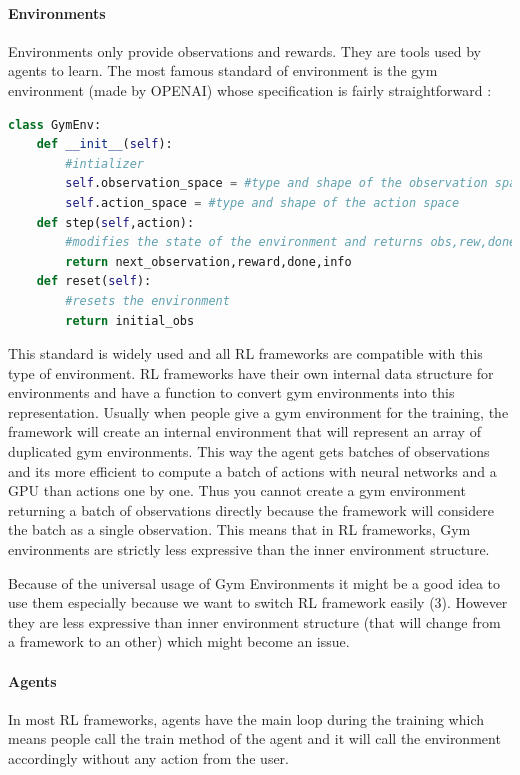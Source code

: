 \documentclass[11pt]{article}
\begin{document}
\paragraph{Environments}
Environments only provide observations and rewards. They are tools used by agents to learn. 
The most famous standard of environment is the gym environment (made by OPENAI) whose specification is fairly straightforward :
\begin{lstlisting}[language=Python]
class GymEnv:
	def __init__(self):
		#intializer
		self.observation_space = #type and shape of the observation space
		self.action_space = #type and shape of the action space
	def step(self,action):
		#modifies the state of the environment and returns obs,rew,done=(if the env needs to be reset),info=debug
		return next_observation,reward,done,info
	def reset(self):
		#resets the environment
		return initial_obs
\end{lstlisting}
This standard is widely used and all RL frameworks are compatible with this type of environment. RL frameworks have their own internal data structure for environments and have a function to convert gym environments into this representation. Usually when people give a gym environment for the training, the framework will create an internal environment that will represent an array of duplicated gym environments. This way the agent gets batches of observations and its more efficient to compute a batch of actions with neural networks and a GPU than actions one by one. Thus you cannot create a gym environment returning a batch of observations directly because the framework will considere the batch as a single observation. This means that in RL frameworks, Gym environments are strictly less expressive than the inner environment structure.

Because of the universal usage of Gym Environments it might be a good idea to use them especially because we want to switch RL framework easily (3). However they are less expressive than inner environment structure (that will change from a framework to an other) which might become an issue.
\paragraph{Agents}
In most RL frameworks, agents have the main loop during the training which means people call the train method of the agent and it will call the environment accordingly without any action from the user.
\end{document}
